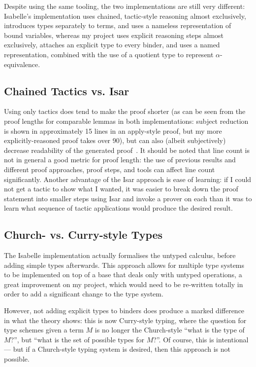 Despite using the same tooling, the two implementations are still very different: Isabelle's implementation uses chained, tactic-style reasoning almost exclusively, introduces types separately to terms, and uses a nameless representation of bound variables, whereas my project uses explicit reasoning steps almost exclusively, attaches an explicit type to every binder, and uses a named representation, combined with the use of a quotient type to represent \(\alpha\)-equivalence.

\subsection{Chained Tactics vs. Isar}
Using only tactics does tend to make the proof shorter (as can be seen from the proof lengths for comparable lemmas in both implementations: subject reduction is shown in approximately 15 lines in an apply-style proof, but my more explicitly-reasoned proof takes over 90), but can also (albeit subjectively) decrease readability of the generated proof~\cite{isar-phd}.
It should be noted that line count is not in general a good metric for proof length: the use of previous results and different proof approaches, proof steps, and tools can affect line count significantly.
Another advantage of the Isar approach is ease of learning: if I could not get a tactic to show what I wanted, it was easier to break down the proof statement into smaller steps using Isar and invoke a prover on each than it was to learn what sequence of tactic applications would produce the desired result.

\subsection{Church- vs. Curry-style Types}
The Isabelle implementation actually formalises the untyped calculus, before adding simple types afterwards.
This approach allows for multiple type systems to be implemented on top of a base that deals only with untyped operations, a great improvement on my project, which would need to be re-written totally in order to add a significant change to the type system.

However, not adding explicit types to binders does produce a marked difference in what the theory shows: this is now Curry-style typing, where the question for type schemes given a term \(M\) is no longer the Church-style ``what is the type of \(M\)?'', but ``what is the set of possible types for \(M\)?''.
Of course, this is intentional --- but if a Church-style typing system is desired, then this approach is not possible.

